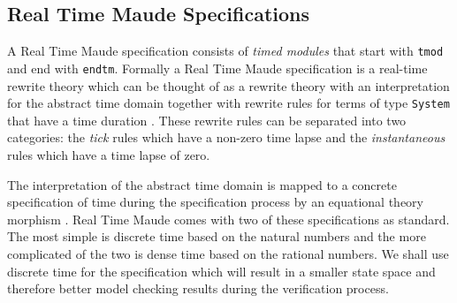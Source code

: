 \subsection{Real Time Maude Specifications}
A Real Time Maude specification consists of \emph{timed modules} that start with \texttt{tmod} and end with \texttt{endtm}. Formally a Real Time Maude specification is a real-time rewrite theory which can be thought of as a rewrite theory with an interpretation for the abstract time domain together with rewrite rules for terms of type \texttt{System} that have a time duration \cite{PO02}. These rewrite rules can be separated into two categories: the \emph{tick} rules which have a non-zero time lapse and the \emph{instantaneous} rules which have a time lapse of zero.

The interpretation of the abstract time domain is mapped to a concrete specification of time during the specification process by an equational theory morphism \cite{PO02}. Real Time Maude comes with two of these specifications as standard. The most simple  is discrete time based on the natural numbers and the more complicated of the two is dense time based on the rational numbers. We shall use discrete time for the specification which will result in a smaller state space and therefore better model checking results during the verification process.
\medskip

